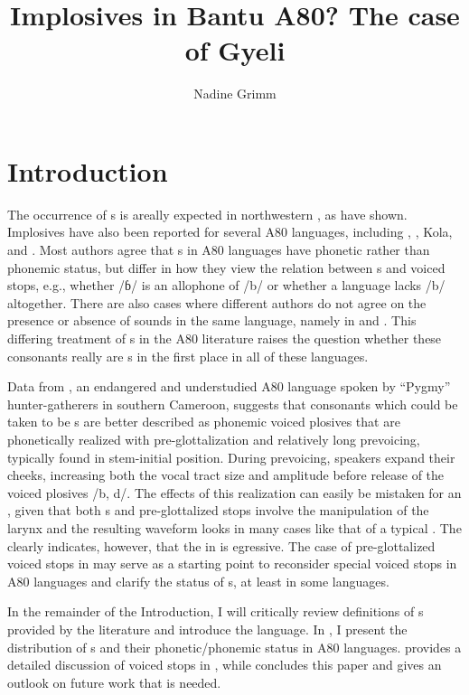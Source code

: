 \documentclass[output=paper,modfonts,nonflat,
 hidelinks
]{langsci/langscibook}
\author{Nadine Grimm\affiliation{University of Rochester}}
\title{Implosives in Bantu A80? The case of Gyeli}
\begin{document}
\maketitle


\section{Introduction} 
\label{sec:grimm:1}

 The occurrence of s is areally expected in northwestern , as  \citet[58]{Clements2008} have shown. Implosives have also been reported for several  A80 languages, including , , Kola, and . Most authors agree that s in A80 languages have phonetic rather than phonemic status, but differ in how they view the relation between s and voiced stops, e.g., whether /ɓ/ is an allophone of /b/ or whether a language lacks /b/ altogether. There are also cases where different authors do not agree on the presence or absence of  sounds in the same language, namely in  and . This differing treatment of s in the A80 literature raises the question whether these consonants really are s in the first place in all of these languages.

Data from , an endangered and understudied  A80 language spoken by ``Pygmy'' hunter-gatherers in southern Cameroon, suggests that consonants which could be taken to be s are better described as phonemic voiced plosives that are phonetically realized with pre-glottalization and relatively long prevoicing, typically found in stem-initial position. During prevoicing, speakers expand their cheeks, increasing both the vocal tract size and amplitude before release of the voiced plosives /b, d/.   The effects of this realization can easily be mistaken for an , given that both s and pre-glottalized stops involve the manipulation of the larynx and the resulting waveform looks in many cases like that of a typical . The  clearly indicates, however, that the  in  is egressive. The case of pre-glottalized voiced stops in  may serve as a starting point to reconsider special voiced stops in A80 languages and clarify the status of s, at least in some languages.

In the remainder of the Introduction, I will critically review definitions of s provided by the literature and introduce the  language. In , I present the distribution of s and their phonetic/phonemic status in  A80 languages.  provides a detailed discussion of voiced stops in , while  concludes this paper and gives an outlook on future work that is needed.
\end{document}
